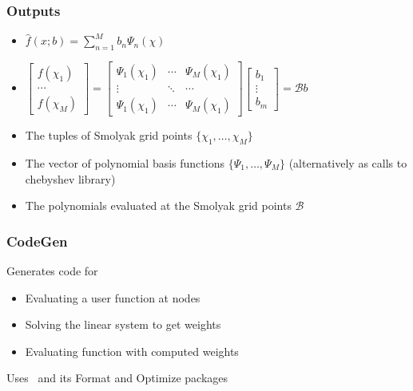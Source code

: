 \documentclass[tikz]{beamer}
\begin{document}
\begin{frame}
  \frametitle{Outputs}
  \begin{itemize}
  \item $\hat{f}(x;b)=\sum_{n=1}^M b_n \Psi_n(\chi)$
  \item $
    \begin{bmatrix}
      f(\chi_1)\\ \cdots \\       f(\chi_M)
    \end{bmatrix}=
      \begin{bmatrix}
        \Psi_1(\chi_1) &\cdots &        \Psi_M(\chi_1)\\
\vdots&\ddots&\cdots\\
        \Psi_1(\chi_1)& \cdots   &      \Psi_M(\chi_1)
      \end{bmatrix}
      \begin{bmatrix}
        b_1\\ \vdots \\ b_m
      \end{bmatrix}= \mathcal{B} b
$
  \item The tuples of Smolyak grid points $\{\chi_1, \ldots , \chi_M\}$
  \item The vector of polynomial basis functions $\{\Psi_1, \ldots , \Psi_M\}$ (alternatively as calls to chebyshev library)
  \item The polynomials evaluated at the Smolyak grid points $\mathcal{B}$
  \end{itemize}
\end{frame}
\begin{frame}
  \frametitle{CodeGen}
Generates code for 

  \begin{itemize}
  \item Evaluating a user function at nodes
  \item Solving the linear system to get weights
  \item Evaluating function with computed weights
  \end{itemize}

 Uses \mma\   and  its Format and Optimize packages

\end{frame}
\end{document}
